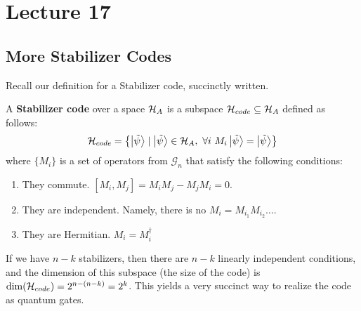 \section{Lecture 17}

\subsection{More Stabilizer Codes}
Recall our definition for a Stabilizer code, succinctly written.
\begin{definition}
    A \textbf{Stabilizer code} over a space $\operatorname{\mathcal{H}}_A$ is a subspace $\operatorname{\mathcal{H}}_{code} \subseteq \operatorname{\mathcal{H}}_A$ defined as follows:
    \[ \operatorname{\mathcal{H}}_{code} = \left\{\ket{\tilde{\psi}} \mid \ket{\tilde{\psi}} \in \operatorname{\mathcal{H}}_A, \text{ } \forall i \text{ } M_i \ket{\tilde{\psi}} = \ket{\tilde{\psi}} \right\} \]
    where $\{ M_i\}$ is a set of operators from $\mathcal{G}_n$ that satisfy the following conditions:
    \begin{enumerate}
        \item They commute. $[M_i, M_j] = M_i M_j - M_j M_i = 0$.
        \item They are independent. Namely, there is no $M_i = M_{i_1} M_{i_2} \dots$.
        \item They are Hermitian. $M_i = M_i^{\dagger}$
    \end{enumerate} 
\end{definition}

If we have $n - k$ stabilizers, then there are $n - k$ linearly independent conditions,
and the dimension of this subspace (the size of the code) is $\dim(\operatorname{\mathcal{H}}_{code}) = 2^{n - (n - k)} = 2^k$.
This yields a very succinct way to realize the code as quantum gates.

